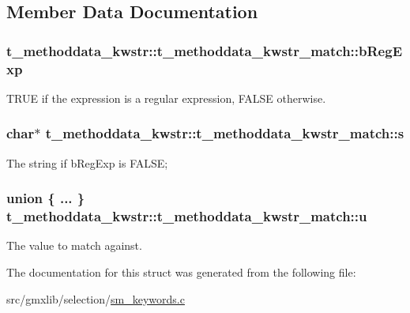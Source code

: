 \subsection{\-Member \-Data \-Documentation}
\hypertarget{structt__methoddata__kwstr_1_1t__methoddata__kwstr__match_a961df7251251de55c84b0a9527f4dd22}{
\subsubsection[{b\-Reg\-Exp}]{ {\bf t\-\_\-methoddata\-\_\-kwstr\-::t\-\_\-methoddata\-\_\-kwstr\-\_\-match\-::b\-Reg\-Exp}}}\label{structt__methoddata__kwstr_1_1t__methoddata__kwstr__match_a961df7251251de55c84b0a9527f4dd22}
\-T\-R\-U\-E if the expression is a regular expression, \-F\-A\-L\-S\-E otherwise. \hypertarget{structt__methoddata__kwstr_1_1t__methoddata__kwstr__match_ab62386848903180c1b925c5e8e69c751}{
\subsubsection[{s}]{\setlength{\rightskip}{0pt plus 5cm}char$\ast$ {\bf t\-\_\-methoddata\-\_\-kwstr\-::t\-\_\-methoddata\-\_\-kwstr\-\_\-match\-::s}}}\label{structt__methoddata__kwstr_1_1t__methoddata__kwstr__match_ab62386848903180c1b925c5e8e69c751}
\-The string if {\ttfamily b\-Reg\-Exp} is \-F\-A\-L\-S\-E; \hypertarget{structt__methoddata__kwstr_1_1t__methoddata__kwstr__match_ac16e8a7239d083c12c4ccc5caa628f71}{
\subsubsection[{u}]{\setlength{\rightskip}{0pt plus 5cm}union \{ ... \}                {\bf t\-\_\-methoddata\-\_\-kwstr\-::t\-\_\-methoddata\-\_\-kwstr\-\_\-match\-::u}}}\label{structt__methoddata__kwstr_1_1t__methoddata__kwstr__match_ac16e8a7239d083c12c4ccc5caa628f71}
\-The value to match against. 

\-The documentation for this struct was generated from the following file\-:\begin{DoxyCompactItemize}
\item 
src/gmxlib/selection/\hyperlink{sm__keywords_8c}{sm\-\_\-keywords.\-c}\end{DoxyCompactItemize}
